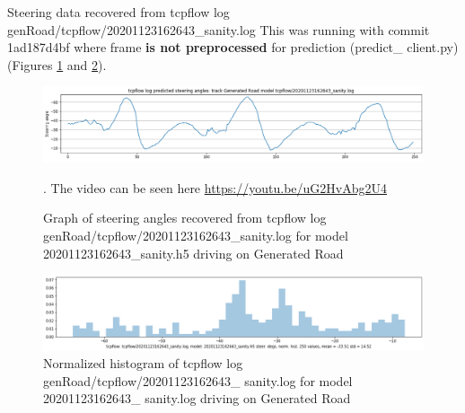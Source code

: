 Steering data recovered from tcpflow log genRoad/tcpflow/20201123162643\_sanity.log
This was running with commit 1ad187d4bf where frame \textbf{is not preprocessed} for prediction (predict\_ client.py) (Figures  \ref{fig:tcpflow_20201123162643_graph} and  \ref{fig:tcpflow_20201123162643_bins}). 

\begin{figure}[ht]
 \centering 
 \includegraphics[width=\textwidth]{Figures/tcpflow_20201123162643_sanity_graph.png}
 \caption{Graph of steering angles recovered from tcpflow log genRoad/tcpflow/20201123162643\_sanity.log for model 20201123162643\_sanity.h5 driving on Generated Road}. The video can be seen here \href{https://youtu.be/uG2HvAbg2U4}{https://youtu.be/uG2HvAbg2U4}
 \label{fig:tcpflow_20201123162643_graph}
\end{figure}

\begin{figure}[ht]
 \centering 
 \includegraphics[width=\textwidth]{Figures/tcpflow_20201123162643_sanity_bins.png}
 \caption{Normalized histogram of tcpflow log genRoad/tcpflow/20201123162643\_ sanity.log for model 20201123162643\_ sanity.log driving on Generated Road}
 \label{fig:tcpflow_20201123162643_bins} 
\end{figure} 

